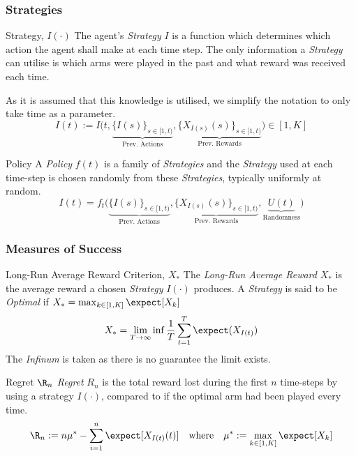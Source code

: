 \documentclass[11pt,a4paper]{article}
\begin{document}
  \subsubsection*{Strategies}

  \begin{definition}{Strategy, $I(\cdot)$}
    The agent's \textit{Strategy} $I$ is a function which determines which action the agent shall make at each time step. The only information a \textit{Strategy} can utilise is which arms were played in the past and what reward was received each time.
    \par As it is assumed that this knowledge is utilised, we simplify the notation to only take time as a parameter.
    \[ I(t):=I\big(t,\underbrace{\{I(s)\}_{s\in[1,t)}}_\text{Prev. Actions},\underbrace{\{X_{I(s)}(s)\}_{s\in[1,t)}}_\text{Prev. Rewards}\big)\in[1,K] \]
  \end{definition}

  \begin{definition}{Policy}
    A \textit{Policy} $f(t)$ is a family of \textit{Strategies} and the \textit{Strategy} used at each time-step is chosen randomly from these \textit{Strategies}, typically uniformly at random.
    \[ I(t)=f_t\big(\underbrace{\{I(s)\}_{s\in[1,t)}}_\text{Prev. Actions},\underbrace{\{X_{I(s)}(s)\}_{s\in[1,t)}}_\text{Prev. Rewards},\underbrace{U(t)}_\text{Randomness}\big) \]
  \end{definition}

  \subsubsection*{Measures of Success}

  \begin{definition}{Long-Run Average Reward Criterion, $X_*$}
    The \textit{Long-Run Average Reward} $X_*$ is the average reward a chosen \textit{Strategy} $I(\cdot)$ produces. A \textit{Strategy} is said to be \textit{Optimal} if $X_*=\max_{k\in[1,K]}\expect[X_k]$
    \[ {\displaystyle X_*=\lim_{T\to\infty}\inf\frac1T\sum_{t=1}^T\expect(X_{I(t)})} \]
    The \textit{Infinum} is taken as there is no guarantee the limit exists.
  \end{definition}

  \begin{definition}{Regret $\R_n$}
    \textit{Regret} $R_n$ is the total reward lost during the first $n$ time-steps by using a strategy $I(\cdot)$, compared to if the optimal arm had been played every time.
    \[ \R_n:=n\mu^*-\sum_{i=1}^n\expect[X_{I(t)}(t)]\quad\text{where}\quad\mu^*:=\max_{k\in[1,K]}\expect[X_k] \]
  \end{definition}
\end{document}
